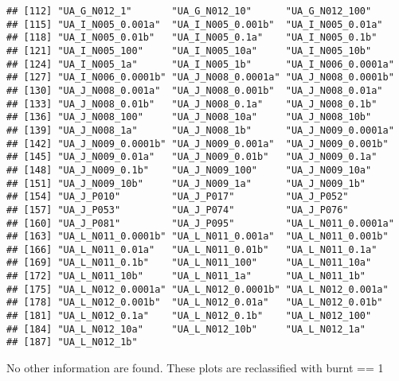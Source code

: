 \documentclass[table]{article}
\newenvironment{Shaded}{\begin{snugshade}}{\end{snugshade}}
\newcommand{\KeywordTok}[1]{\textcolor[rgb]{0.13,0.29,0.53}{\textbf{#1}}}
\newcommand{\DataTypeTok}[1]{\textcolor[rgb]{0.13,0.29,0.53}{#1}}
\newcommand{\DecValTok}[1]{\textcolor[rgb]{0.00,0.00,0.81}{#1}}
\newcommand{\StringTok}[1]{\textcolor[rgb]{0.31,0.60,0.02}{#1}}
\newcommand{\OperatorTok}[1]{\textcolor[rgb]{0.81,0.36,0.00}{\textbf{#1}}}
\newcommand{\NormalTok}[1]{#1}
\begin{document}
\begin{verbatim}
## [112] "UA_G_N012_1"       "UA_G_N012_10"      "UA_G_N012_100"    
## [115] "UA_I_N005_0.001a"  "UA_I_N005_0.001b"  "UA_I_N005_0.01a"  
## [118] "UA_I_N005_0.01b"   "UA_I_N005_0.1a"    "UA_I_N005_0.1b"   
## [121] "UA_I_N005_100"     "UA_I_N005_10a"     "UA_I_N005_10b"    
## [124] "UA_I_N005_1a"      "UA_I_N005_1b"      "UA_I_N006_0.0001a"
## [127] "UA_I_N006_0.0001b" "UA_J_N008_0.0001a" "UA_J_N008_0.0001b"
## [130] "UA_J_N008_0.001a"  "UA_J_N008_0.001b"  "UA_J_N008_0.01a"  
## [133] "UA_J_N008_0.01b"   "UA_J_N008_0.1a"    "UA_J_N008_0.1b"   
## [136] "UA_J_N008_100"     "UA_J_N008_10a"     "UA_J_N008_10b"    
## [139] "UA_J_N008_1a"      "UA_J_N008_1b"      "UA_J_N009_0.0001a"
## [142] "UA_J_N009_0.0001b" "UA_J_N009_0.001a"  "UA_J_N009_0.001b" 
## [145] "UA_J_N009_0.01a"   "UA_J_N009_0.01b"   "UA_J_N009_0.1a"   
## [148] "UA_J_N009_0.1b"    "UA_J_N009_100"     "UA_J_N009_10a"    
## [151] "UA_J_N009_10b"     "UA_J_N009_1a"      "UA_J_N009_1b"     
## [154] "UA_J_P010"         "UA_J_P017"         "UA_J_P052"        
## [157] "UA_J_P053"         "UA_J_P074"         "UA_J_P076"        
## [160] "UA_J_P081"         "UA_J_P095"         "UA_L_N011_0.0001a"
## [163] "UA_L_N011_0.0001b" "UA_L_N011_0.001a"  "UA_L_N011_0.001b" 
## [166] "UA_L_N011_0.01a"   "UA_L_N011_0.01b"   "UA_L_N011_0.1a"   
## [169] "UA_L_N011_0.1b"    "UA_L_N011_100"     "UA_L_N011_10a"    
## [172] "UA_L_N011_10b"     "UA_L_N011_1a"      "UA_L_N011_1b"     
## [175] "UA_L_N012_0.0001a" "UA_L_N012_0.0001b" "UA_L_N012_0.001a" 
## [178] "UA_L_N012_0.001b"  "UA_L_N012_0.01a"   "UA_L_N012_0.01b"  
## [181] "UA_L_N012_0.1a"    "UA_L_N012_0.1b"    "UA_L_N012_100"    
## [184] "UA_L_N012_10a"     "UA_L_N012_10b"     "UA_L_N012_1a"     
## [187] "UA_L_N012_1b"
\end{verbatim}

No other information are found. These plots are reclassified with burnt
== 1

\begin{Shaded}
\end{Shaded}
\end{document}

